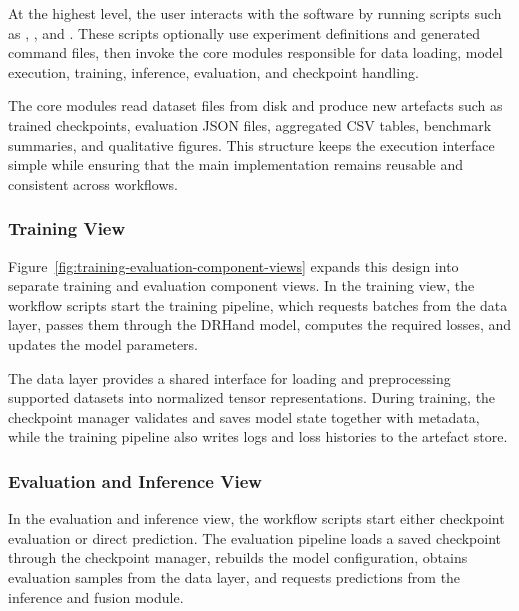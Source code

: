 ﻿\documentclass[11pt,a4paper]{article}
\begin{document}
\medskip

At the highest level, the user interacts with the software by running scripts
such as , , and
. These scripts optionally use experiment
definitions and generated command files, then invoke the core modules
responsible for data loading, model execution, training, inference, evaluation,
and checkpoint handling.

\medskip

The core modules read dataset files from disk and produce new artefacts such as
trained checkpoints, evaluation JSON files, aggregated CSV tables, benchmark
summaries, and qualitative figures. This structure keeps the execution
interface simple while ensuring that the main implementation remains reusable
and consistent across workflows.

\subsubsection*{Training View}

Figure~\ref{fig:training-evaluation-component-views} expands this design into
separate training and evaluation component views. In the training view, the
workflow scripts start the training pipeline, which requests batches from the
data layer, passes them through the DRHand model, computes the required losses,
and updates the model parameters.

\medskip

The data layer provides a shared interface for loading and preprocessing
supported datasets into normalized tensor representations. During training, the
checkpoint manager validates and saves model state together with metadata,
while the training pipeline also writes logs and loss histories to the
artefact store.

\subsubsection*{Evaluation and Inference View}

In the evaluation and inference view, the workflow scripts start either
checkpoint evaluation or direct prediction. The evaluation pipeline loads a
saved checkpoint through the checkpoint manager, rebuilds the model
configuration, obtains evaluation samples from the data layer, and requests
predictions from the inference and fusion module.

\medskip
\end{document}

